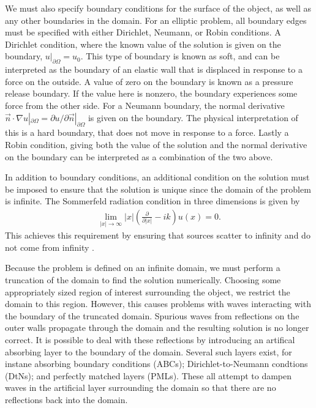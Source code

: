 We must also specify boundary conditions for the surface of the object, as well as any other boundaries in the domain.
For an elliptic problem, all boundary edges must be specified with either Dirichlet, Neumann, or Robin conditions.
A Dirichlet condition, where the known value of the solution is given on the boundary, $u|_{\partial\Omega}=u_0$.
This type of boundary is known as soft, and can be interpreted as the boundary of an elastic wall that is displaced in response to a force on the outside.
A value of zero on the boundary is known as a pressure release boundary.
If the value here is nonzero, the boundary experiences some force from the other side.
For a Neumann boundary, the normal derivative $\vec{n}\cdot \nabla u |_{\partial \Omega} = \partial u / \partial \vec{n} |_{\partial \Omega}$ is given on the boundary.
The physical interpretation of this is a hard boundary, that does not move in response to a force.
Lastly a Robin condition, giving both the value of the solution and the normal derivative on the boundary can be interpreted as a combination of the two above.



In addition to boundary conditions, an additional condition on the solution must be imposed to ensure that the solution is unique since the domain of the problem is infinite.
The Sommerfeld radiation condition in three dimensions is given by
\begin{align}
	\lim_{|x|\rightarrow \infty} |x| \left( \frac{\partial}{\partial |x|} - ik \right) u(x) = 0. \label{eqn:sommerfeld}
\end{align}
This achieves this requirement by ensuring that sources scatter to infinity and do not come from infinity \cite{sommerfeld}.

Because the problem is defined on an infinite domain, we must perform a truncation of the domain to find the solution numerically.
Choosing some appropriately sized region of interest surrounding the object, we restrict the domain to this region.
However, this causes problems with waves interacting with the boundary of the truncated domain.
Spurious waves from reflections on the outer walls propagate through the domain and the resulting solution is no longer correct.
It is possible to deal with these reflections by introducing an artifical absorbing layer to the boundary of the domain.
Several such layers exist, for instane absorbing boundary conditions (ABCs); Dirichlet-to-Neumann condtions (DtNs); and perfectly matched layers (PMLs).
These all attempt to dampen waves in the artificial layer surrounding the domain so that there are no reflections back into the domain.



